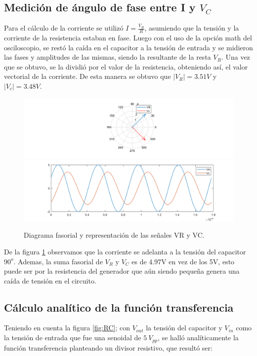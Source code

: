 \subsection{Medición de ángulo de fase entre I y $V_C$}

Para el cálculo de la corriente se utilizó $I=\frac{V_{R}}{R}$, asumiendo que la tensión y la corriente de la resistencia estaban en fase. 
Luego con el uso de la opción math del osciloscopio, se restó la caída en el capacitor a la tensión de entrada y se midieron las fases y amplitudes de las mismas, siendo la resultante de la resta $V_R$. Una vez que se obtuvo, se la dividió por el valor de la resistencia, obteniendo así, el valor vectorial de la corriente.
De esta manera se obtuvo que $|V_{R}|=3.51V$ y $|V_{c}|=3.48V$.

\begin{figure}[H]
\centering
\includegraphics[scale=0.5]{1-2.png}
\includegraphics[scale=0.5]{1-2b.png}
\caption{Diagrama fasorial y representación de las señales VR y VC.}
\label{diagfasorial}
\end{figure}


De la figura \ref{diagfasorial} observamos que la corriente se adelanta a la tensión del capacitor $90^{o}$. Ademas, la suma fasorial de $V_R$ y $V_C$ es de 4.97V en vez de los 5V, esto puede ser por la resistencia del generador que aún siendo pequeña genera una caída de tensión en el circuito.

\subsection{Cálculo analítico de la función transferencia}

Teniendo en cuenta la figura \ref{fig:RC}; con $V_{out}$ la tensión del capacitor y $V_{in}$ como la tensión de entrada que fue una senoidal de $5~V_{pp}$, se halló analíticamente la función transferencia planteando un divisor resistivo, que resultó ser:

